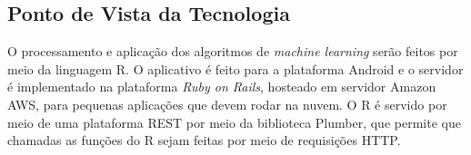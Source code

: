 \subsection{Ponto de Vista da Tecnologia}
O processamento e aplicação dos algoritmos de \textit{machine learning} serão feitos por meio da linguagem R. O aplicativo é feito para a plataforma Android e o servidor é implementado na plataforma \textit{Ruby on Rails}, hosteado em servidor Amazon AWS, para pequenas aplicações que devem rodar na nuvem. O R é servido por meio de uma plataforma REST por meio da biblioteca Plumber, que permite que chamadas as funções do R sejam feitas por meio de requisições HTTP.

